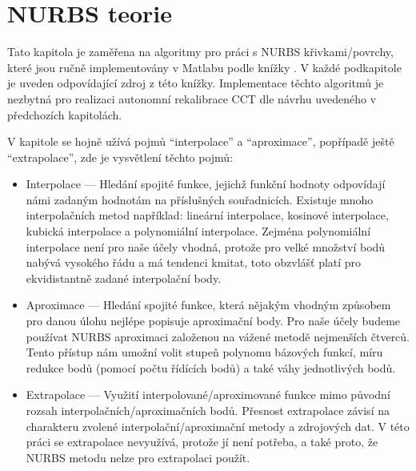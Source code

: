 \section{NURBS teorie}\label{section: NURBS teorie}
Tato kapitola je zaměřena na algoritmy pro práci s NURBS křivkami/povrchy, které jsou ručně implementovány v Matlabu podle knížky \cite{The_NURBS_Book}. V každé podkapitole je uveden odpovídající zdroj z této knížky. Implementace těchto algoritmů je nezbytná pro realizaci autonomní rekalibrace CCT dle návrhu uvedeného v předchozích kapitolách.
\par
V kapitole se hojně užívá pojmů ``interpolace'' a ``aproximace'', popřípadě ještě ``extrapolace'', zde je vysvětlení těchto pojmů:
\begin{itemize}
    \item Interpolace --- Hledání spojité funkce, jejichž funkční hodnoty odpovídají námi zadaným hodnotám na příslušných souřadnicích. Existuje mnoho interpolačních metod například: lineární interpolace, kosinové interpolace, kubická interpolace a polynomiální interpolace. Zejména polynomiální interpolace není pro naše účely vhodná, protože pro velké množství bodů nabývá vysokého řádu a má tendenci kmitat, toto obzvlášť platí pro ekvidistantně zadané interpolační body.
    \item Aproximace --- Hledání spojité funkce, která nějakým vhodným způsobem pro danou úlohu nejlépe popisuje aproximační body. Pro naše účely budeme používat NURBS aproximaci založenou na vážené metodě nejmenších čtverců. Tento přístup nám umožní volit stupeň polynomu bázových funkcí, míru redukce bodů (pomocí počtu řídících bodů) a také váhy jednotlivých bodů.
    \item Extrapolace --- Využití interpolované/aproximované funkce mimo původní rozsah interpolačních/aproximačních bodů. Přesnost extrapolace závisí na charakteru zvolené interpolační/aproximační metody a zdrojových dat. V této práci se extrapolace nevyužívá, protože jí není potřeba, a také proto, že NURBS metodu nelze pro extrapolaci použít.
\end{itemize}